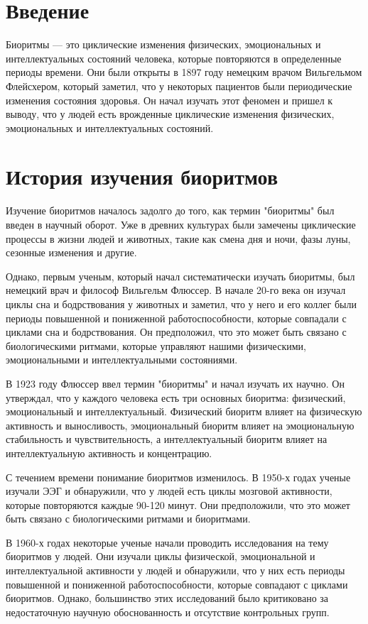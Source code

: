 \newpage

\section{Введение}

Биоритмы --- это циклические изменения физических, эмоциональных и интеллектуальных состояний человека, которые повторяются в определенные периоды времени. Они были открыты в 1897 году немецким врачом Вильгельмом Флейсхером, который заметил, что у некоторых пациентов были периодические изменения состояния здоровья. Он начал изучать этот феномен и пришел к выводу, что у людей есть врожденные циклические изменения физических, эмоциональных и интеллектуальных состояний.

\section{История изучения биоритмов}

Изучение биоритмов началось задолго до того, как термин "биоритмы" был введен в научный оборот. Уже в древних культурах были замечены циклические процессы в жизни людей и животных, такие как смена дня и ночи, фазы луны, сезонные изменения и другие.

Однако, первым ученым, который начал систематически изучать биоритмы, был немецкий врач и философ Вильгельм Флюссер. В начале 20-го века он изучал циклы сна и бодрствования у животных и заметил, что у него и его коллег были периоды повышенной и пониженной работоспособности, которые совпадали с циклами сна и бодрствования. Он предположил, что это может быть связано с биологическими ритмами, которые управляют нашими физическими, эмоциональными и интеллектуальными состояниями.

В 1923 году Флюссер ввел термин "биоритмы" и начал изучать их научно. Он утверждал, что у каждого человека есть три основных биоритма: физический, эмоциональный и интеллектуальный. Физический биоритм влияет на физическую активность и выносливость, эмоциональный биоритм влияет на эмоциональную стабильность и чувствительность, а интеллектуальный биоритм влияет на интеллектуальную активность и концентрацию.

С течением времени понимание биоритмов изменилось. В 1950-х годах ученые изучали ЭЭГ и обнаружили, что у людей есть циклы мозговой активности, которые повторяются каждые 90-120 минут. Они предположили, что это может быть связано с биологическими ритмами и биоритмами.

В 1960-х годах некоторые ученые начали проводить исследования на тему биоритмов у людей. Они изучали циклы физической, эмоциональной и интеллектуальной активности у людей и обнаружили, что у них есть периоды повышенной и пониженной работоспособности, которые совпадают с циклами биоритмов. Однако, большинство этих исследований было критиковано за недостаточную научную обоснованность и отсутствие контрольных групп.

